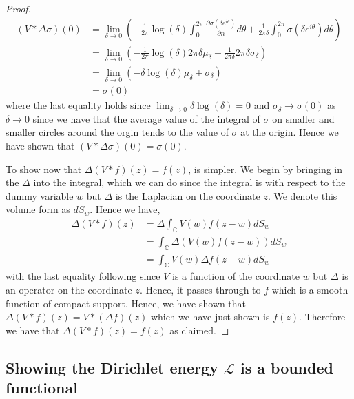 \documentclass[11pt]{report}
\theoremstyle{definition}
\begin{document}
\begin{proof}
  \begin{align*}
    (V * \Delta \sigma)(0) &=\lim_{\delta \rightarrow 0} \left( -\frac{1}{2\pi}\log(\delta) \int_{0}^{2\pi} \frac{\partial \sigma(\delta e^{i\theta})}{\partial n} d\theta + \frac{1}{2\pi \delta}\int_{0}^{2\pi}\sigma(\delta e^{i\theta})d\theta\right) \\
    &= \lim_{\delta \rightarrow 0} \left( -\frac{1}{2\pi}\log(\delta)2\pi \delta \mu_{\delta}  +  \frac{1}{2\pi \delta} 2\pi \delta \overline{\sigma_{\delta}}\right) \\
    &= \lim_{\delta \rightarrow 0} \left( -\delta \log(\delta)  \mu_{\delta}  + \overline{\sigma_{\delta}}\right) \\
    &= \sigma(0)
  \end{align*}
  where the last equality holds since $\lim_{\delta \rightarrow 0}\delta \log(\delta) = 0$ and $\overline{\sigma_{\delta}} \rightarrow \sigma(0)$ as $\delta \rightarrow 0$ since we have that the average value of the integral of $\sigma$ on smaller and smaller circles around the orgin tends to the value of $\sigma$ at the origin.
  Hence we have shown that $(V * \Delta \sigma)(0) = \sigma(0)$.

  To show now that $\Delta(V*f)(z) = f(z)$, is simpler. We begin by bringing in the $\Delta$ into the integral, which we can do since the integral is with respect to the dummy variable $w$ but $\Delta$ is the Laplacian on the coordinate $z$. We denote this volume form as $dS_w$. Hence we have,
  \begin{align*}
    \Delta(V*f)(z) &= \Delta \int_\mathbb{C} V(w)f(z-w)dS_w \\
    &= \int_\mathbb{C} \Delta \left(V(w)f(z-w)\right)dS_w \\
    &= \int_\mathbb{C} V(w)\Delta f(z-w)dS_w
  \end{align*}
  with the last equality following since $V$ is a function of the coordinate $w$ but $\Delta$ is an operator on the coordinate $z$. Hence, it passes through to $f$ which is a smooth function of compact support. Hence, we have shown that $\Delta(V*f)(z) = V*(\Delta f)(z)$ which we have just shown is $f(z)$. Therefore we have that $\Delta(V*f)(z) = f(z)$ as claimed.
\end{proof} 

\subsection{Showing the Dirichlet energy $\mathcal{L}$ is a bounded functional}
\end{document}
